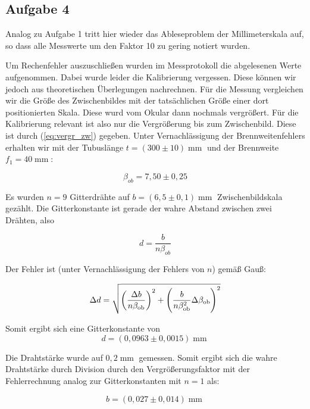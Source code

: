 \documentclass[a4paper,german,12pt,smallheadings]{scrartcl}
\begin{document}
\subsection{Aufgabe 4}
Analog zu Aufgabe 1 tritt hier wieder das Ableseproblem der Millimeterskala
auf, so dass alle Messwerte um den Faktor 10 zu gering notiert wurden.

Um Rechenfehler auszuschließen wurden im Messprotokoll die abgelesenen Werte
aufgenommen. Dabei wurde leider die Kalibrierung vergessen. Diese können wir
jedoch aus theoretischen Überlegungen nachrechnen. Für die Messung vergleichen
wir die Größe des Zwischenbildes mit der tatsächlichen Größe einer dort
positionierten Skala. Diese wurd vom Okular dann nochmals vergrößert. Für
die Kalibrierung relevant ist also nur die Vergrößerung bis zum Zwischenbild.
Diese ist durch (\ref{eq:vergr_zw}) gegeben. Unter Vernachlässigung der
Brennweitenfehlers erhalten wir mit der Tubuslänge $t = (300\pm10)
\operatorname{mm}$ und der Brennweite $f_1 = 40 \operatorname{mm}$:

\begin{equation}
  \beta_{ob} = 7{,}50 \pm 0{,}25
\end{equation}

Es wurden $n = 9$ Gitterdrähte auf $b = (6{,}5\pm0{,}1) \operatorname{mm}$
Zwischenbildskala gezählt. Die Gitterkonstante ist gerade der wahre Abstand
zwischen zwei Drähten, also

\begin{equation}
  d = \frac{b}{n \beta_{ob}}
\end{equation}

Der Fehler ist (unter Vernachlässigung der Fehlers von $n$) gemäß Gauß:

\begin{equation}
  \Delta d = \sqrt{
    \del{\frac{\Delta b}{n \beta_\text{ob}}}^2 +
    \del{\frac{b}{n \beta_\text{ob}^2} \Delta \beta_\text{ob}}^2
  }
\end{equation}

Somit ergibt sich eine Gitterkonstante von
\begin{equation}
  d = (0{,}0963 \pm 0{,}0015) \operatorname{mm}
\end{equation}

Die Drahtstärke wurde auf $0{,}2 \operatorname{mm}$ gemessen. Somit ergibt sich
die wahre Drahtstärke durch Division durch den Vergrößerungsfaktor mit der
Fehlerrechnung analog zur Gitterkonstanten mit $n = 1$ als:

\begin{equation}
  b = (0{,}027\pm0{,}014) \operatorname{mm}
\end{equation}
\end{document}

